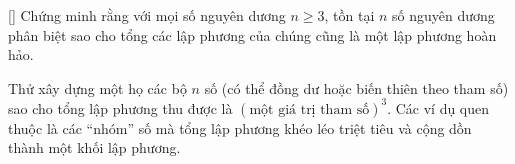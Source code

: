 \documentclass[../04-diophantine-equations.tex]{subfiles}
\begin{document}
\begin{exercise*}\label{example:BGR-2015-EGMO-TST-P6}[\textbf{}]
	Chứng minh rằng với mọi số nguyên dương \( n \geq 3 \),
	tồn tại \( n \) số nguyên dương phân biệt sao cho tổng các lập phương của chúng cũng là một lập phương hoàn hảo.
\end{exercise*}

\begin{remark*}
	Thử xây dựng một họ các bộ \( n \) số (có thể đồng dư hoặc biến thiên theo tham số) sao cho tổng lập phương thu được là \( (\text{một giá trị tham số})^3 \).  
	Các ví dụ quen thuộc là các “nhóm” số mà tổng lập phương khéo léo triệt tiêu và cộng dồn thành một khối lập phương.
\end{remark*}
\end{document}

